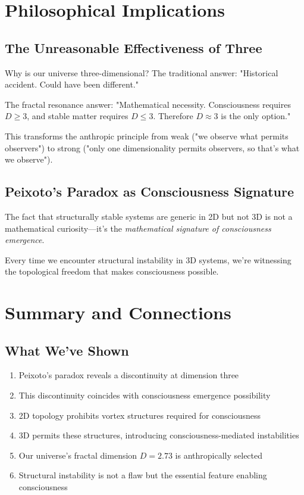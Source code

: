 \section{Philosophical Implications}

\subsection{The Unreasonable Effectiveness of Three}

Why is our universe three-dimensional? The traditional answer: "Historical accident. Could have been different."

The fractal resonance answer: "Mathematical necessity. Consciousness requires $D \geq 3$, and stable matter requires $D \leq 3$. Therefore $D \approx 3$ is the only option."

This transforms the anthropic principle from weak ("we observe what permits observers") to strong ("only one dimensionality permits observers, so that's what we observe").

\subsection{Peixoto's Paradox as Consciousness Signature}

The fact that structurally stable systems are generic in 2D but not 3D is not a mathematical curiosity—it's the \textit{mathematical signature of consciousness emergence}.

Every time we encounter structural instability in 3D systems, we're witnessing the topological freedom that makes consciousness possible.

\section{Summary and Connections}

\subsection{What We've Shown}

\begin{enumerate}
\item Peixoto's paradox reveals a discontinuity at dimension three
\item This discontinuity coincides with consciousness emergence possibility
\item 2D topology prohibits vortex structures required for consciousness
\item 3D permits these structures, introducing consciousness-mediated instabilities
\item Our universe's fractal dimension $D = 2.73$ is anthropically selected
\item Structural instability is not a flaw but the essential feature enabling consciousness
\end{enumerate}

